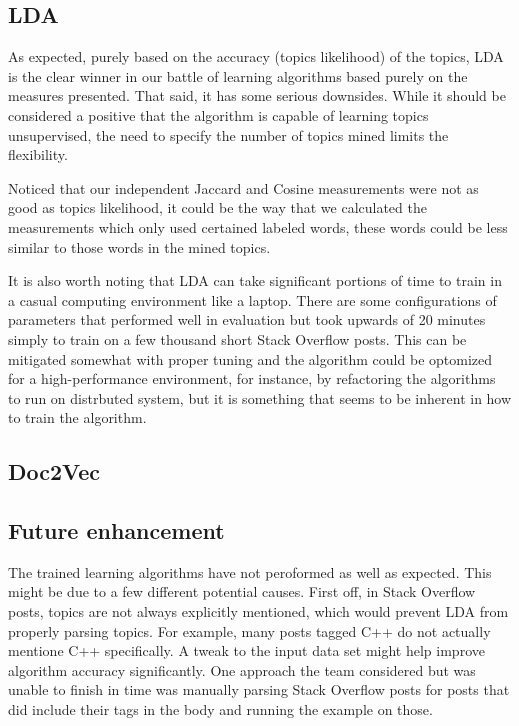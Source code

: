 \subsection{LDA}
\label{sec:conc:lda}
As expected, purely based on the accuracy (topics likelihood) of the 
topics, LDA is the clear winner in our battle of learning algorithms 
based purely on the measures presented. 
That said, it has some serious downsides.
While it should be considered a positive that the algorithm is capable
of learning topics unsupervised, the need to specify the number of
topics mined limits the flexibility.

Noticed that our independent Jaccard and Cosine measurements were not 
as good as topics likelihood, it could be the way that we calculated 
the measurements which only used certained labeled words, these words 
could be less similar to those words in the mined topics.

It is also worth noting that LDA can take significant portions of time
to train in a casual computing environment like a laptop.
There are some configurations of parameters that performed well in
evaluation but took upwards of 20 minutes simply to train on a few
thousand short Stack Overflow posts.
This can be mitigated somewhat with proper tuning and the algorithm
could be optomized for a high-performance environment, for instance, 
by refactoring the algorithms to run on distrbuted system, but it is
something that seems to be inherent in how to train the algorithm.

% 
\subsection{Doc2Vec}
\label{sec:conc:doc2vec}



\subsection{Future enhancement}
The trained learning algorithms have not peroformed as well as
expected.
This might be due to a few different potential causes.
First off, in Stack Overflow posts, topics are not always explicitly
mentioned, which would prevent LDA from properly parsing topics.
For example, many posts tagged C++ do not actually mentione C++
specifically.
A tweak to the input data set might help improve algorithm accuracy
significantly.
One approach the team considered but was unable to finish in time was
manually parsing Stack Overflow posts for posts that did include their
tags in the body and running the example on those.  

